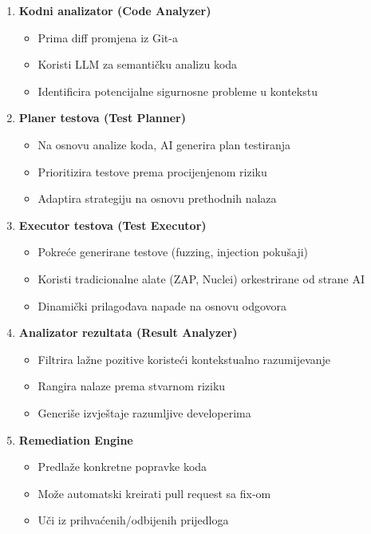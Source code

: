 \documentclass[12pt,a4paper]{article}
\begin{document}
\begin{enumerate}
    \item \textbf{Kodni analizator (Code Analyzer)}
    \begin{itemize}
        \item Prima diff promjena iz Git-a
        \item Koristi LLM za semantičku analizu koda
        \item Identificira potencijalne sigurnosne probleme u kontekstu
    \end{itemize}
    
    \item \textbf{Planer testova (Test Planner)}
    \begin{itemize}
        \item Na osnovu analize koda, AI generira plan testiranja
        \item Prioritizira testove prema procijenjenom riziku
        \item Adaptira strategiju na osnovu prethodnih nalaza
    \end{itemize}
    
    \item \textbf{Executor testova (Test Executor)}
    \begin{itemize}
        \item Pokreće generirane testove (fuzzing, injection pokušaji)
        \item Koristi tradicionalne alate (ZAP, Nuclei) orkestrirane od strane AI
        \item Dinamički prilagođava napade na osnovu odgovora
    \end{itemize}
    
    \item \textbf{Analizator rezultata (Result Analyzer)}
    \begin{itemize}
        \item Filtrira lažne pozitive koristeći kontekstualno razumijevanje
        \item Rangira nalaze prema stvarnom riziku
        \item Generiše izvještaje razumljive developerima
    \end{itemize}
    
    \item \textbf{Remediation Engine}
    \begin{itemize}
        \item Predlaže konkretne popravke koda
        \item Može automatski kreirati pull request sa fix-om
        \item Uči iz prihvaćenih/odbijenih prijedloga
    \end{itemize}
\end{enumerate}
\end{document}
